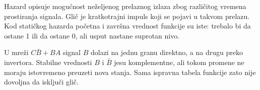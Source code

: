 
Hazard opisuje mogućnost neželjenog prelaznog izlaza zbog različitog vremena prostiranja signala. Glič je kratkotrajni impuls koji se pojavi u takvom prelazu. Kod statičkog hazarda početna i završna vrednost funkcije su iste: trebalo bi da ostane 1 ili da ostane 0, ali usput nastane suprotan nivo.

U mreži \(C\bar B+BA\) signal \(B\) dolazi na jednu granu direktno, a na drugu preko invertora. Stabilne vrednosti \(B\) i \(\bar B\) jesu komplementne, ali tokom promene ne moraju istovremeno preuzeti nova stanja. Sama ispravna tabela funkcije zato nije dovoljna da isključi glič.
